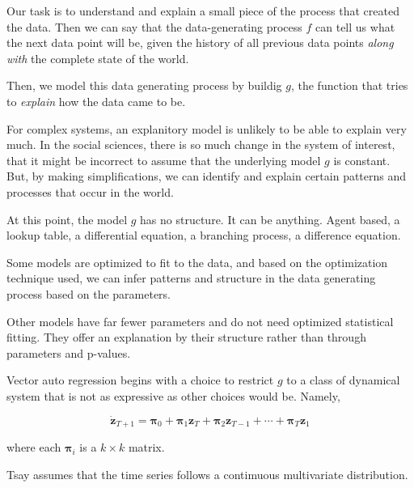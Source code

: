 \documentclass{article}
\begin{document}
        Our task is to understand and explain a small piece of
        the process that created the data. Then we can say that
        the data-generating process $f$ can tell us what the next
        data point will be, given the history of all previous data
        points \textit{along with} the complete state of 
        the world.
    
        Then, we model this data generating process by buildig $g$,
        the function that tries to \textit{explain} how the data
        came to be.
    
        For complex systems, an explanitory model is unlikely to
        be able to explain very much. In the social sciences,
        there is so much change in the system of interest, that it might
        be incorrect to assume that the underlying model $g$ is constant.
        But, by making simplifications, we can identify and explain
        certain patterns and processes that occur in the world.
    
        At this point, the model $g$ has no structure. It can be anything.
        Agent based, a lookup table, a differential equation, a
        branching process, a difference equation.
    
        Some models are optimized to fit to the data, and based on 
        the optimization technique used, we can infer patterns and 
        structure in the data generating process based on the parameters.
        
        Other models have far fewer parameters and do not need optimized
        statistical fitting. They offer an explanation by their structure
        rather than through parameters and p-values.
    
        Vector auto regression begins with a choice to restrict $g$
        to a class of dynamical system that is not as expressive as 
        other choices would be.
        Namely,
    
        \begin{equation}
            \dot{\mathbf{z}}_{T+1} = \mathbf{\pi}_0 
                + \mathbf{\pi}_1\mathbf{z}_T 
                + \mathbf{\pi}_2\mathbf{z}_{T-1} 
                + \cdots 
                + \mathbf{\pi}_T\mathbf{z}_1
        \end{equation}

        where each $\mathbf{\pi}_i$ is a $k \times k$ matrix.

        Tsay assumes that the time series follows
        a contimuous multivariate distribution. 
\end{document}
